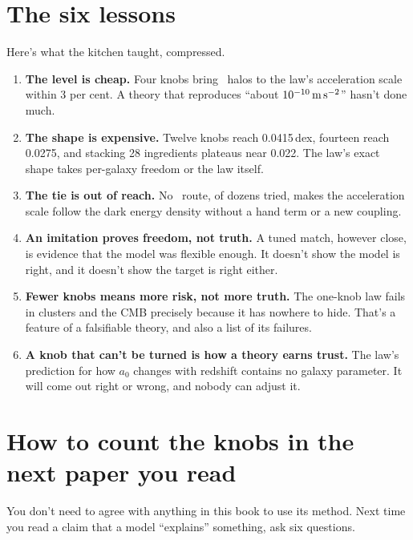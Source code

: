 \section{The six lessons}

Here's what the kitchen taught, compressed.

\begin{enumerate}
\item \textbf{The level is cheap.} Four knobs bring \LCDM\ halos to the law's acceleration scale within 3 per cent. A theory that reproduces ``about $10^{-10}\,\mathrm{m\,s^{-2}}$'' hasn't done much.
\item \textbf{The shape is expensive.} Twelve knobs reach 0.0415\,dex, fourteen reach 0.0275, and stacking 28 ingredients plateaus near 0.022. The law's exact shape takes per-galaxy freedom or the law itself.
\item \textbf{The tie is out of reach.} No \LCDM\ route, of dozens tried, makes the acceleration scale follow the dark energy density without a hand term or a new coupling.
\item \textbf{An imitation proves freedom, not truth.} A tuned match, however close, is evidence that the model was flexible enough. It doesn't show the model is right, and it doesn't show the target is right either.
\item \textbf{Fewer knobs means more risk, not more truth.} The one-knob law fails in clusters and the CMB precisely because it has nowhere to hide. That's a feature of a falsifiable theory, and also a list of its failures.
\item \textbf{A knob that can't be turned is how a theory earns trust.} The law's prediction for how $a_0$ changes with redshift contains no galaxy parameter. It will come out right or wrong, and nobody can adjust it.
\end{enumerate}

\section{How to count the knobs in the next paper you read}

You don't need to agree with anything in this book to use its method. Next time you read a claim that a model ``explains'' something, ask six questions.




